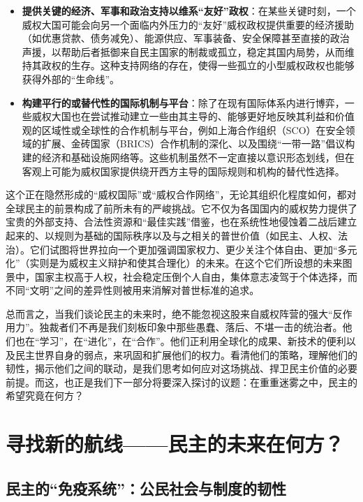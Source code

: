 \documentclass[UTF8, 10pt]{ctexbook}
\begin{document}
\begin{itemize}
    \item \textbf{提供关键的经济、军事和政治支持以维系“友好”政权}：在某些关键时刻，一个威权大国可能会向另一个面临内外压力的“友好”威权政权提供重要的经济援助（如优惠贷款、债务减免）、能源供应、军事装备、安全保障甚至直接的政治声援，以帮助后者抵御来自民主国家的制裁或孤立，稳定其国内局势，从而维持其政权的生存。这种支持网络的存在，使得一些孤立的小型威权政权也能够获得外部的“生命线”。
    \item \textbf{构建平行的或替代性的国际机制与平台}：除了在现有国际体系内进行博弈，一些威权大国也在尝试推动建立一些由其主导的、能够更好地反映其利益和价值观的区域性或全球性的合作机制与平台，例如上海合作组织（SCO）在安全领域的扩展、金砖国家（BRICS）合作机制的深化、以及围绕“一带一路”倡议构建的经济和基础设施网络等。这些机制虽然不一定直接以意识形态划线，但在客观上可能为威权国家提供绕开西方主导的国际规则和机构的替代性选择。
\end{itemize}
这个正在隐然形成的“威权国际”或“威权合作网络”，无论其组织化程度如何，都对全球民主的前景构成了前所未有的严峻挑战。它不仅为各国国内的威权势力提供了宝贵的外部支持、合法性资源和“最佳实践”借鉴，也在系统性地侵蚀着二战后建立起来的、以规则为基础的国际秩序以及与之相关的普世价值（如民主、人权、法治）。它们试图将世界拉向一个更加强调国家权力、更少关注个体自由、更加“多元化”（实则是为威权主义辩护和使其合理化）的未来。在这个它们所设想的未来图景中，国家主权高于人权，社会稳定压倒个人自由，集体意志凌驾于个体选择，而不同“文明”之间的差异性则被用来消解对普世标准的追求。

总而言之，当我们谈论民主的未来时，绝不能忽视这股来自威权阵营的强大“反作用力”。独裁者们不再是我们刻板印象中那些愚蠢、落后、不堪一击的统治者。他们也在“学习”，在“进化”，在“合作”。他们正利用全球化的成果、新技术的便利以及民主世界自身的弱点，来巩固和扩展他们的权力。看清他们的策略，理解他们的韧性，揭示他们之间的联动，是我们思考如何应对这场挑战、捍卫民主价值的必要前提。而这，也正是我们下一部分将要深入探讨的议题：在重重迷雾之中，民主的希望究竟在何方？

\part{寻找新的航线——民主的未来在何方？}

\chapter{民主的“免疫系统”：公民社会与制度的韧性}
\end{document}
